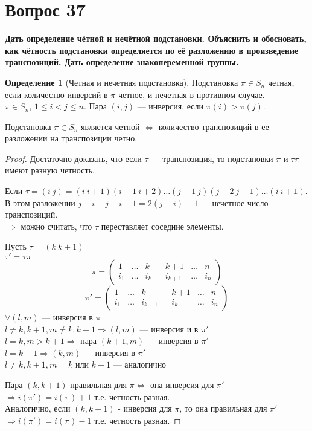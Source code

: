 \documentclass{article}
\theoremstyle{definition}
\newtheorem{definition}{Определение}
\theoremstyle{plain}
\begin{document}
\section{Вопрос 37}
\textbf{Дать определение чётной и нечётной подстановки.
Объяснить и обосновать, как чётность подстановки определяется по её разложению в произведение транспозиций.
Дать определение знакопеременной группы.}

\begin{definition}[Четная и нечетная подстановка]
  Подстановка $\pi \in S_{n}$ четная, если количество инверсий в $\pi$ четное, и нечетная в противном случае.\\
  $\pi \in S_{n}$, $1 \leq i < j \leq n$.
  Пара $(i, j)$ --- инверсия, если $\pi(i) > \pi(j)$.
\end{definition}

Подстановка $\pi \in S_{n}$ является четной $\Leftrightarrow$ количество транспозиций в ее разложении на транспозиции четно.

\begin{proof}
  Достаточно доказать, что если $\tau$ --- транспозиция, то подстановки $\pi$ и $\tau \pi$ имеют разную четность.

  Если $\tau = (i\ j) = (i\ i+1)(i+1\ i+2)\dots(j-1\ j)(j-2\ j-1)\ldots(i\ i+1)$.
  В этом разложении $j - i + j - i - 1 = 2 (j - i) - 1$ --- нечетное число транспозиций.\\
  $\Rightarrow$ можно считать, что $\tau$ переставляет соседние элементы.

  Пусть $\tau = (k\ k+1)$\\
  $\tau' = \tau\pi$
  \begin{equation*}
    \pi =
    \begin{pmatrix}
      1 & \ldots & k & & k + 1 & \ldots & n\\
      i_{1} & \ldots & i_{k} & & i_{k+1} & \ldots & i_{n}
    \end{pmatrix}
  \end{equation*}
  \begin{equation*}
    \pi' =
    \begin{pmatrix}
      1 & \ldots & k & & k + 1 & \ldots & n\\
      i_{1} & \ldots & i_{k+1} & & i_{k} & \ldots & i_{n}
    \end{pmatrix}
  \end{equation*}
  $\forall (l, m)$ --- инверсия в $\pi$\\
  $l \neq k, k+1, m \neq k, k+1 \Rightarrow (l, m)$ --- инверсия и в $\pi'$\\
  $l = k, m > k+1 \Rightarrow$ пара $(k+1, m)$ --- инверсия в $\pi'$\\
  $l = k+1 \Rightarrow (k, m)$ --- инверсия в $\pi'$\\
  $l \neq k,k+1, m = k$ или $k+1$ --- аналогично

  Пара $(k, k+1)$ правильная для $\pi \Leftrightarrow$ она инверсия для $\pi'$ $\Rightarrow i(\pi') = i(\pi) + 1$ т.е. четность разная.\\
  Аналогично, если $(k, k+1)$ - инверсия для $\pi$, то она правильная для $\pi'$ $\Rightarrow i(\pi') = i(\pi) - 1$ т.е. четность разная.
\end{proof}
\end{document}
